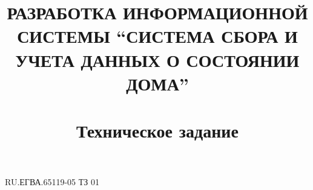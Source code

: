 \documentclass[a4paper,12pt]{article}
\begin{document}
\sloppy
\title{РАЗРАБОТКА ИНФОРМАЦИОННОЙ СИСТЕМЫ “СИСТЕМА СБОРА И УЧЕТА ДАННЫХ О СОСТОЯНИИ ДОМА”\\
~\\
Техническое задание}

\begin{uspd}{RU.ЕГВА.65119-05 ТЗ 01}



\end{uspd}
\end{document}
